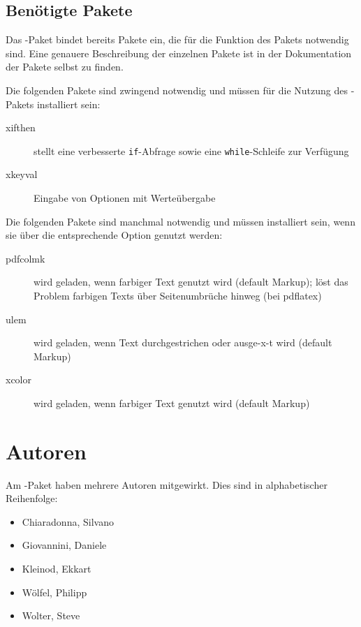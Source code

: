 \subsection{Benötigte Pakete}
\label{sec:user:packages}

Das -Paket bindet bereits Pakete ein, die für die Funktion des Pakets notwendig sind.
Eine genauere Beschreibung der einzelnen Pakete ist in der Dokumentation der Pakete selbst zu finden.

Die folgenden Pakete sind zwingend notwendig und müssen für die Nutzung des -Pakets installiert sein:
\begin{description}
	\item [xifthen] stellt eine verbesserte \texttt{if}-Abfrage sowie eine \texttt{while}-Schleife zur Verfügung
	\item [xkeyval] Eingabe von Optionen mit Werteübergabe
\end{description}

Die folgenden Pakete sind manchmal notwendig und müssen installiert sein, wenn sie über die entsprechende Option genutzt werden:
\begin{description}
	\item [pdfcolmk] wird geladen, wenn farbiger Text genutzt wird (default Markup); löst das Problem farbigen Texts über Seitenumbrüche hinweg (bei pdflatex)
	\item [ulem] wird geladen, wenn Text durchgestrichen oder ausge-x-t wird (default Markup)
	\item [xcolor] wird geladen, wenn farbiger Text genutzt wird (default Markup)
\end{description}


\section{Autoren}
\label{sec:authors}

Am -Paket haben mehrere Autoren mitgewirkt.
Dies sind in alphabetischer Reihenfolge:
\begin{itemize}
	\item Chiaradonna, Silvano
	\item Giovannini, Daniele
	\item Kleinod, Ekkart
	\item Wölfel, Philipp
	\item Wolter, Steve
\end{itemize}



